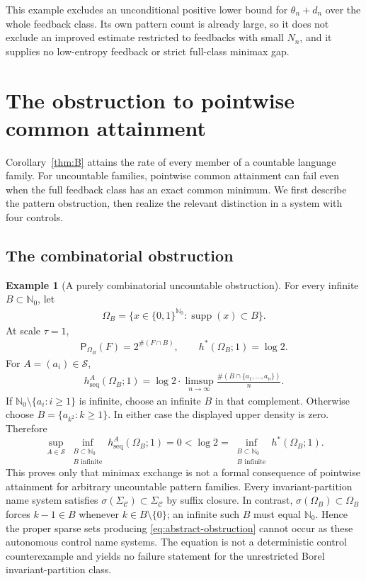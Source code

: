 \documentclass[11pt,reqno]{amsart}
\numberwithin{equation}{section}
\theoremstyle{definition}
\newtheorem{example}[theorem]{Example}
\theoremstyle{definition}
\newcommand{\Nzero}{\mathbb N_0}
\newcommand{\C}{\mathcal C}
\newcommand{\Patt}{\mathsf P}
\newcommand{\hseq}{h_{\mathrm{seq}}}
\newcommand{\hpat}{h^{*}}
\newcommand{\supp}{\operatorname{supp}}
\begin{document}
This example excludes an unconditional positive lower bound for
$\theta_n+d_n$ over the whole feedback class. Its own pattern
count is already large, so it does not exclude an improved estimate
restricted to feedbacks with small $N_n$, and it supplies no
low-entropy feedback or strict full-class minimax gap.


\section{The obstruction to pointwise common attainment}
\label{app:pointwise}

Corollary~\ref{thm:B} attains the rate of every member of a countable
language family. For uncountable families, pointwise common
attainment can fail even when the full feedback class has an exact
common minimum. We first describe the pattern obstruction, then realize the relevant
distinction in a system with four controls.

\subsection{The combinatorial obstruction}

\begin{example}[A purely combinatorial uncountable obstruction]
\label{ex:uncountable}
For every infinite $B\subset\Nzero$, let
\begin{align*}
 \Omega_B=\{x\in\{0,1\}^{\Nzero}:\supp(x)\subset B\}.
\end{align*}
At scale $\tau=1$,
\begin{align*}
 \Patt_{\Omega_B}(F)=2^{\#(F\cap B)},
 \qquad \hpat(\Omega_B;1)=\log2.
\end{align*}
For $A=(a_i)\in\mathscr S$,
\begin{align*}
 \hseq^A(\Omega_B;1)
 =\log2\cdot\limsup_{n\to\infty}
 \frac{\#(B\cap\{a_1,\ldots,a_n\})}{n}.
\end{align*}
If $\Nzero\setminus\{a_i:i\ge1\}$ is infinite, choose an infinite $B$ in that
complement.  Otherwise choose $B=\{a_{k^2}:k\ge1\}$.  In either case the
displayed upper density is zero.  Therefore
\begin{equation}\label{eq:abstract-obstruction}
 \sup_{A\in\mathscr S}
 \inf_{\substack{B\subset\Nzero\\B\text{ infinite}}}
 \hseq^A(\Omega_B;1)=0
 <\log2
 =\inf_{\substack{B\subset\Nzero\\B\text{ infinite}}}
 \hpat(\Omega_B;1).
\end{equation}
This proves only that minimax exchange is not a formal consequence of
pointwise attainment for arbitrary uncountable pattern families.  Every
invariant-partition name system satisfies
$\sigma(\Sigma_\C)\subset\Sigma_\C$ by suffix closure.  In contrast,
$\sigma(\Omega_B)\subset\Omega_B$ forces $k-1\in B$ whenever
$k\in B\setminus\{0\}$; an infinite such $B$ must equal $\Nzero$.  Hence the
proper sparse sets producing \eqref{eq:abstract-obstruction} cannot occur as
these autonomous control name systems.  The equation is not a deterministic
control counterexample and yields no failure statement for the unrestricted
Borel invariant-partition class.
\end{example}
\end{document}
